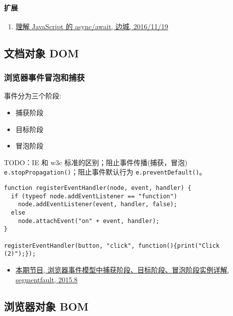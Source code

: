 \paragraph{扩展}\label{ux6269ux5c55}

\begin{enumerate}
\def\labelenumi{\arabic{enumi}.}
\tightlist
\item
  \href{https://segmentfault.com/a/1190000007535316}{理解 JavaScript 的
  async/await, 边城, 2016/11/19}
\end{enumerate}

\subsection{文档对象 DOM}\label{ux6587ux6863ux5bf9ux8c61-dom}

\subsubsection{浏览器事件冒泡和捕获}\label{ux6d4fux89c8ux5668ux4e8bux4ef6ux5192ux6ce1ux548cux6355ux83b7}

事件分为三个阶段:

\begin{itemize}
\tightlist
\item
  捕获阶段
\item
  目标阶段
\item
  冒泡阶段
\end{itemize}

TODO：IE 和 w3c 标准的区别；阻止事件传播(捕获，冒泡)
\lstinline!e.stopPropagation()!；阻止事件默认行为
\lstinline!e.preventDefault()!。

\begin{lstlisting}
function registerEventHandler(node, event, handler) {
  if (typeof node.addEventListener == "function")
    node.addEventListener(event, handler, false);
  else
    node.attachEvent("on" + event, handler);
}

registerEventHandler(button, "click", function(){print("Click (2)");});
\end{lstlisting}

\begin{itemize}
\tightlist
\item
  \href{http://segmentfault.com/a/1190000003482372}{本期节目,
  浏览器事件模型中捕获阶段、目标阶段、冒泡阶段实例详解, segmentfault,
  2015.8}
\end{itemize}

\subsection{浏览器对象 BOM}\label{ux6d4fux89c8ux5668ux5bf9ux8c61-bom}


